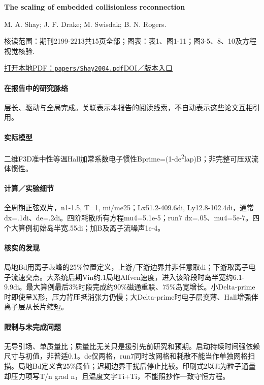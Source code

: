 \textbf{The scaling of embedded collisionless reconnection}\citep{Shay2004}\

M. A. Shay;  J. F. Drake;  M. Swisdak;  B. N. Rogers.

\textsf{核读范围：}期刊2199-2213共15页全部；\textsf{图表：}表1、图1-11；图3-5、8、10及方程视觉核验.

\href{run:papers/Shay2004.pdf}{打开本地PDF：\texttt{papers/Shay2004.pdf}}\quad\href{https://doi.org/10.1063/1.1705650}{DOI／版本入口}

\paragraph{在报告中的研究脉络}\hyperref[story:global]{层长、驱动与全局完成}。关联表示本报告的阅读线索，不自动表示这些论文互相引用。

\paragraph{实际模型}二维F3D准中性等温Hall加常系数电子惯性Bprime=(1-de\textsuperscript{2}lap)B；非完整可压双流体惯性。

\paragraph{计算／实验细节}全周期正弦双片，n1-1.5, T=1, mi/me25；Lx51.2-409.6di, Ly12.8-102.4di，通常dx=.1di、de=.2di。四阶耗散所有方程mu4=5.1e-5；run7 dx=.05、mu4=5e-7。四个大算例初始岛半宽.55di；加B及离子流噪声1e-4。

\paragraph{核实的发现}局地Bd用离子Jz峰的25\%位置定义，上游/下游边界并非任意取di；下游取离子电子流速交点。大系统后期Vin约.1局地Alfven速度，进入该阶段时岛半宽约6.1-9.9di。最大算例最后3\%时段完成约90\%磁通重联、75\%岛宽增长。小Delta-prime时即使呈X形，压力背压抵消张力仍慢；大Delta-prime时电子层变薄、Hall增强伴离子层从长片缩短。

\paragraph{限制与未完成问题}无导引场、单质量比；质量比无关只是援引先前研究和预期。启动持续时间强依赖尺寸与初值，非普适0.1。de仅两格，run7同时改网格和耗散不能当作单独网格扫描。局地Bd定义含25\%阈值；迟期边界干扰后停止比较。印刷式2以Ji为粒子通量却压力项写T/n grad n，且温度文字Ti+Ti，不能照抄作一致守恒方程。

